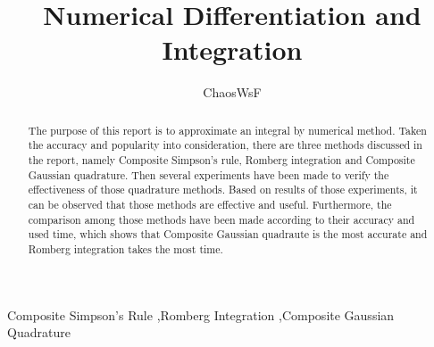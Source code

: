 \documentclass[preprint,12pt]{elsarticle}
\begin{document}
\begin{frontmatter}


\title{Numerical Differentiation and Integration}




\author{ChaosWsF}

\address{No.00, X University}

\begin{abstract}
The purpose of this report is to approximate an integral by numerical method. Taken the accuracy and popularity into consideration, there are three methods discussed in the report, namely Composite Simpson's rule, Romberg integration and Composite Gaussian quadrature. Then several experiments have been made to verify the effectiveness of those quadrature methods. Based on results of those experiments, it can be observed that those methods are effective and useful. Furthermore, the comparison among those methods have been made according to their accuracy and used time, which shows that Composite Gaussian quadraute is the most accurate and Romberg integration takes the most time.
\end{abstract}

\begin{keyword}
Composite Simpson's Rule \sep Romberg Integration \sep Composite Gaussian Quadrature


\end{keyword}

\end{frontmatter}
\end{document}

